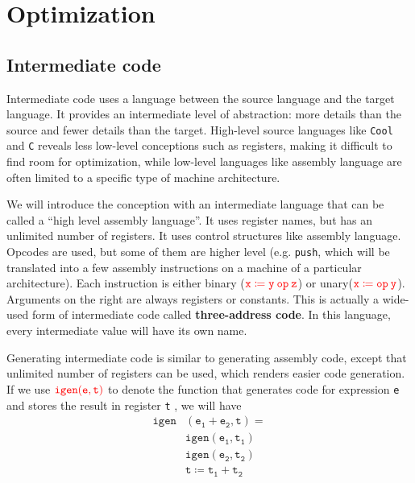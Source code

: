 \ifx\PREAMBLE\undefined


\fi
\chapter{Optimization}
\section{Intermediate code}
Intermediate code uses a language between the source language and the target language. It provides an intermediate level of abstraction: more details than the source and fewer details than the target. High-level source languages like \texttt{Cool} and \texttt{C} reveals less low-level conceptions such as registers, making it difficult to find room for optimization, while low-level languages like assembly language are often limited to a specific type of machine architecture. 

We will introduce the conception with an intermediate language that can be called a ``high level assembly language''. It uses register names, but has an unlimited number of registers. It uses control structures like assembly language. Opcodes are used, but some of them are higher level (e.g. \texttt{\color{red}push}, which will be translated into a few assembly instructions on a machine of a particular architecture). Each instruction is either binary ($\mathtt{\color{red}x\coloneqq y\:op\:z}$) or unary($\mathtt{\color{red}x\coloneqq op\:y}$). Arguments on the right are always registers or constants. This is actually a wide-used form of intermediate code called \textbf{three-address code}. In this language, every intermediate value will have its own name. 

Generating intermediate code is similar to generating assembly code, except that unlimited number of registers can be used, which renders easier code generation. If we use $\color{red}\mathtt{igen(e,t)}$ to denote the function that generates code for expression \texttt{e} and stores the result in register \texttt{t} , we will have 
\begin{align*}
\mathtt{igen}&\mathtt{(e_1 + e_2,t)=}\\
&\mathtt{igen(e_1,t_1)}\\
&\mathtt{igen(e_2,t_2)}\\
&\mathtt{t\coloneqq t_1 + t_2}
\end{align*}
